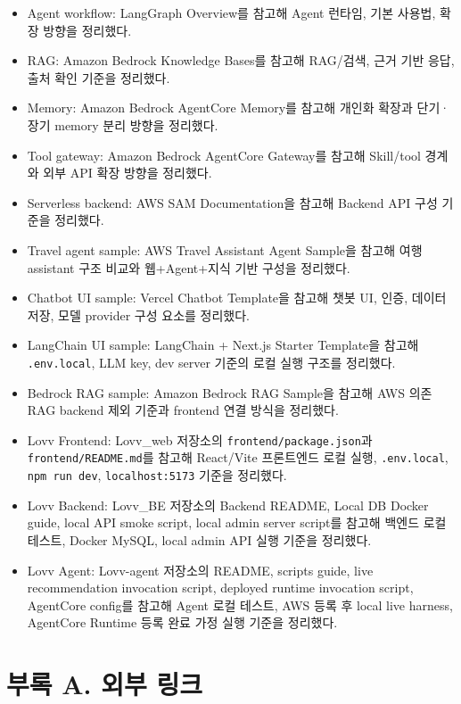 \documentclass[12pt,a4paper]{article}
\newcommand{\DocNeedspace}[1]{\par\ifdim\dimexpr\pagegoal-\pagetotal\relax<#1\newpage\fi}
\newcommand{\TocNoChildTight}{\vspace{-0.28em}}
\begin{document}
\begin{itemize}
\item Agent workflow: LangGraph Overview를 참고해 Agent 런타임, 기본 사용법, 확장 방향을 정리했다.
\item RAG: Amazon Bedrock Knowledge Bases를 참고해 RAG/검색, 근거 기반 응답, 출처 확인 기준을 정리했다.
\item Memory: Amazon Bedrock AgentCore Memory를 참고해 개인화 확장과 단기·장기 memory 분리 방향을 정리했다.
\item Tool gateway: Amazon Bedrock AgentCore Gateway를 참고해 Skill/tool 경계와 외부 API 확장 방향을 정리했다.
\item Serverless backend: AWS SAM Documentation을 참고해 Backend API 구성 기준을 정리했다.
\item Travel agent sample: AWS Travel Assistant Agent Sample을 참고해 여행 assistant 구조 비교와 웹+Agent+지식 기반 구성을 정리했다.
\item Chatbot UI sample: Vercel Chatbot Template을 참고해 챗봇 UI, 인증, 데이터 저장, 모델 provider 구성 요소를 정리했다.
\item LangChain UI sample: LangChain + Next.js Starter Template을 참고해 \texttt{.\allowbreak{}env.\allowbreak{}local}, LLM key, dev server 기준의 로컬 실행 구조를 정리했다.
\item Bedrock RAG sample: Amazon Bedrock RAG Sample을 참고해 AWS 의존 RAG backend 제외 기준과 frontend 연결 방식을 정리했다.
\item Lovv Frontend: Lovv\_web 저장소의 \texttt{frontend/\allowbreak{}package.\allowbreak{}json}과 \texttt{frontend/\allowbreak{}README.\allowbreak{}md}를 참고해 React/Vite 프론트엔드 로컬 실행, \texttt{.\allowbreak{}env.\allowbreak{}local}, \texttt{npm run dev}, \texttt{localhost:\allowbreak{}5173} 기준을 정리했다.
\item Lovv Backend: Lovv\_BE 저장소의 Backend README, Local DB Docker guide, local API smoke script, local admin server script를 참고해 백엔드 로컬 테스트, Docker MySQL, local admin API 실행 기준을 정리했다.
\item Lovv Agent: Lovv-agent 저장소의 README, scripts guide, live recommendation invocation script, deployed runtime invocation script, AgentCore config를 참고해 Agent 로컬 테스트, AWS 등록 후 local live harness, AgentCore Runtime 등록 완료 가정 실행 기준을 정리했다.
\end{itemize}


\newpage

\DocNeedspace{10\baselineskip}
\section*{부록 A. 외부 링크}
\addtocontents{toc}{\protect\TocNoChildTight}
\end{document}

